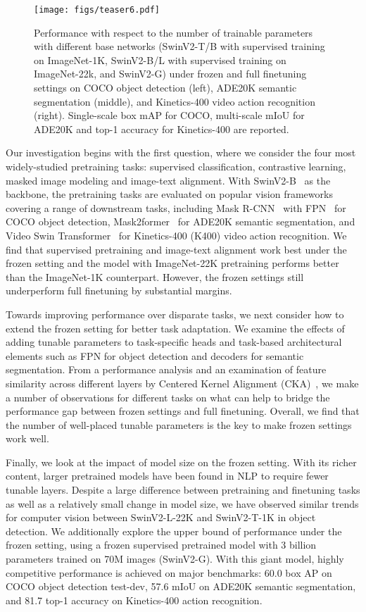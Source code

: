 \documentclass{article}
\begin{document}
\begin{figure}
    \centering
    \texttt{[image: figs/teaser6.pdf]}
    \caption{Performance with respect to the number of trainable parameters with different base networks (SwinV2-T/B with supervised training on ImageNet-1K, SwinV2-B/L with supervised training on ImageNet-22k, and SwinV2-G) under frozen and full finetuning settings on COCO object detection (left), ADE20K semantic segmentation (middle), and Kinetics-400 video action recognition (right). Single-scale box mAP for COCO, multi-scale mIoU for ADE20K and top-1 accuracy for Kinetics-400 are reported.}
    \label{fig:teaser}
    \vspace{-1em}
\end{figure}

Our investigation begins with the first question, where we consider the four most widely-studied pretraining tasks: supervised classification, contrastive learning, masked image modeling and image-text alignment. With SwinV2-B~\cite{liu2021swin,swinv2} as the backbone, the pretraining tasks are evaluated on popular vision frameworks covering a range of downstream tasks, including Mask R-CNN~\cite{Mask-rcnn} with FPN~\cite{FPN} for COCO object detection, Mask2former~\cite{mask2former} for ADE20K semantic segmentation, and Video Swin Transformer~\cite{liu2021video} for Kinetics-400 (K400) video action recognition. We find that supervised pretraining and image-text alignment work best under the frozen setting and the model with ImageNet-22K pretraining performs better than the ImageNet-1K counterpart. However, the frozen settings still underperform full finetuning by substantial margins.

Towards improving performance over disparate tasks, we next consider how to extend the frozen setting for better task adaptation. We examine the effects of adding tunable parameters to task-specific heads and task-based architectural elements such as FPN for object detection and decoders for semantic segmentation. From a performance analysis and an examination of feature similarity across different layers by Centered Kernel Alignment (CKA)~\cite{cka}, we make a number of observations for different tasks on what can help to bridge the performance gap between frozen settings and full finetuning. Overall, we find that the number of well-placed tunable parameters is the key to make frozen settings work well. 

Finally, we look at the impact of model size on the frozen setting. With its richer content, larger pretrained models have been found in NLP to require fewer tunable layers. Despite a large difference between pretraining and finetuning tasks as well as a relatively small change in model size, we have observed similar trends for computer vision between SwinV2-L-22K and SwinV2-T-1K in object detection. We additionally explore the upper bound of performance under the frozen setting, using a frozen supervised pretrained model with 3 billion parameters trained on 70M images (SwinV2-G). With this giant model, highly competitive performance is achieved on major benchmarks: 60.0 box AP on COCO object detection test-dev, 57.6 mIoU on ADE20K semantic segmentation, and 81.7 top-1 accuracy on Kinetics-400 action recognition. 
\end{document}
